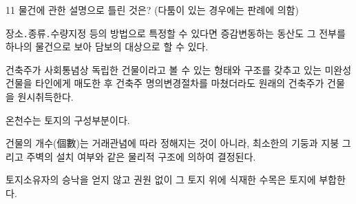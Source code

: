 \begin{question}{11}
물건에 관한 설명으로 틀린 것은? (다툼이 있는 경우에는 판례에 의함)
\begin{choices}
  \item 장소․종류․수량지정 등의 방법으로 특정할 수 있다면 증감변동하는 동산도 그 전부를 하나의 물건으로 보아 담보의 대상으로 할 수 있다.
  \item 건축주가 사회통념상 독립한 건물이라고 볼 수 있는 형태와 구조를 갖추고 있는 미완성 건물을 타인에게 매도한 후 건축주 명의변경절차를 마쳤더라도 원래의 건축주가 건물을 원시취득한다.
  \item 온천수는 토지의 구성부분이다.
  \item 건물의 개수(個數)는 거래관념에 따라 정해지는 것이 아니라, 최소한의 기둥과 지붕 그리고 주벽의 설치 여부와 같은 물리적 구조에 의하여 결정된다.
  \item 토지소유자의 승낙을 얻지 않고 권원 없이 그 토지 위에 식재한 수목은 토지에 부합한다.
\end{choices}
\end{question}
